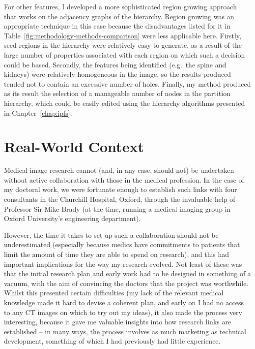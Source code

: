 For other features, I developed a more sophisticated region growing approach that works on the adjacency graphs of the hierarchy. Region growing was an appropriate technique in this case because the disadvantages listed for it in Table~\ref{fig:methodology-methods-comparison} were less applicable here. Firstly, seed regions in the hierarchy were relatively easy to generate, as a result of the large number of properties associated with each region on which such a decision could be based. Secondly, the features being identified (e.g.~the spine and kidneys) were relatively homogeneous in the image, so the results produced tended not to contain an excessive number of holes. Finally, my method produced as its result the selection of a manageable number of nodes in the partition hierarchy, which could be easily edited using the hierarchy algorithms presented in Chapter~\ref{chap:ipfs}.


\section{Real-World Context}


Medical image research cannot (and, in any case, should not) be undertaken without active collaboration with those in the medical profession. In the case of my doctoral work, we were fortunate enough to establish such links with four consultants in the Churchill Hospital, Oxford, through the invaluable help of Professor Sir Mike Brady (at the time, running a medical imaging group in Oxford University's engineering department).

However, the time it takes to set up such a collaboration should not be underestimated (especially because medics have commitments to patients that limit the amount of time they are able to spend on research), and this had important implications for the way my research evolved. Not least of these was that the initial research plan and early work had to be designed in something of a vacuum, with the aim of convincing the doctors that the project was worthwhile. Whilst this presented certain difficulties (my lack of the relevant medical knowledge made it hard to devise a coherent plan, and early on I had no access to any CT images on which to try out my ideas), it also made the process very interesting, because it gave me valuable insights into how research links are established -- in many ways, the process involves as much marketing as technical development, something of which I had previously had little experience.

